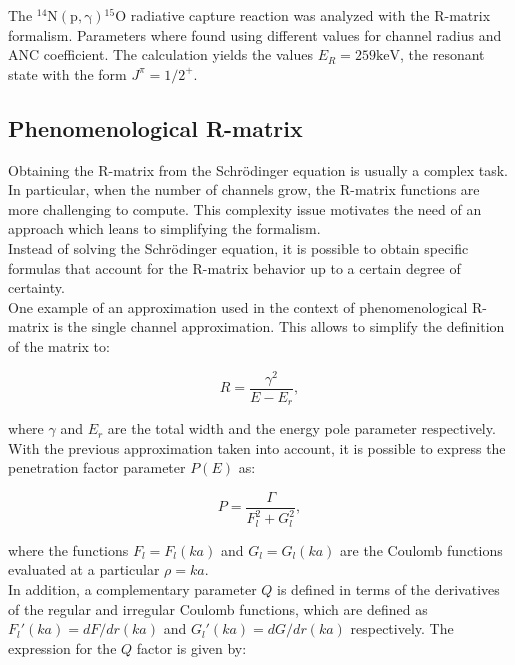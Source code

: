 \documentclass[openany]{book}
\begin{document}
The $\mathrm{{}^{14}N(p, \gamma){}^{15}O}$ radiative capture reaction was analyzed with the R-matrix formalism.  Parameters where found using different values for channel radius and ANC coefficient. The calculation yields the values $E_{R} = 259 \mathrm{keV}$, the resonant state with the form $J^{\pi} = 1/2^{+}$. \\


\subsection{Phenomenological R-matrix} \label{sub:rmatrix_phenomenological}

Obtaining the R-matrix from the Schrödinger equation is usually a complex task. In particular, when the number of channels grow, the R-matrix functions are more challenging to compute. This complexity issue motivates the need of an approach which leans to simplifying the formalism.  \\

Instead of solving the Schrödinger equation, it is possible to obtain specific formulas that account for the R-matrix  behavior up to a certain degree of certainty.  \\

One example of an approximation used in the context of phenomenological R-matrix is the single channel approximation. This allows to simplify the definition of the matrix to: 

\begin{equation} \label{eq:rmatrix_simplified }
	R= \frac{\gamma^2}{E - E_r},
\end{equation}

where $\gamma$ and $E_r$ are the total width and the energy pole parameter respectively. \\

With the previous approximation taken into account, it is possible to express the penetration factor parameter $P(E)$ as:

\begin{equation} \label{eq:rmatrix_penetrationFactor_coulomb}
	P= \frac{\Gamma}{F_l^2 + G_l^2},
\end{equation}

where the functions $F_l = F_l(ka)$ and $G_l = G_l(ka)$ are the Coulomb functions evaluated at a particular $\rho = ka$. \\

In addition, a complementary parameter $Q$ is defined in terms of the derivatives of the regular and irregular Coulomb functions, which are defined as $F_l'(ka) = dF/dr(ka)$ and $G_l'(ka) = dG/dr(ka)$ respectively. The expression for the $Q$ factor is given by: 
\end{document}
